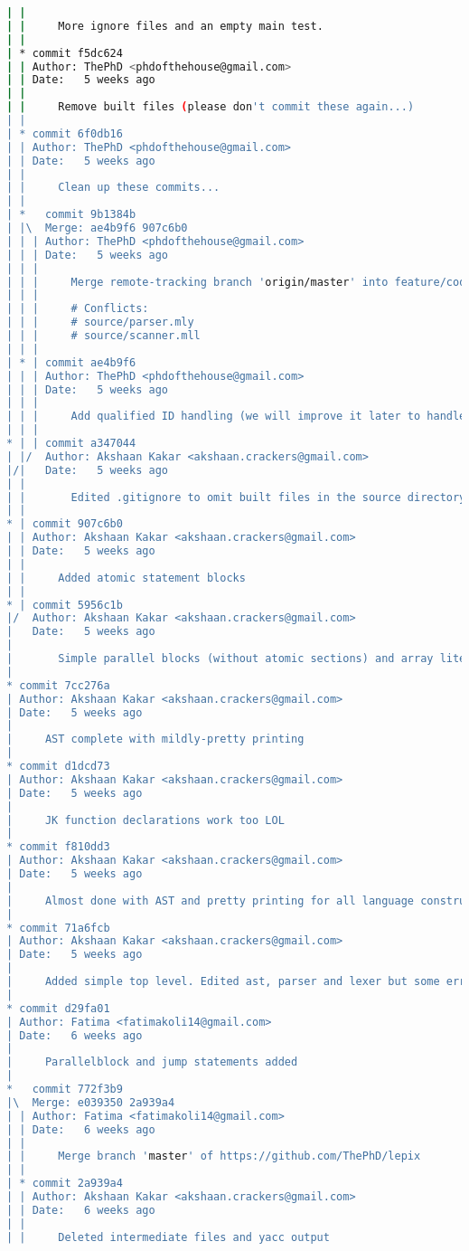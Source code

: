 \begin{lstlisting}[language=bash]
| | 
| |     More ignore files and an empty main test.
| |   
| * commit f5dc624
| | Author: ThePhD <phdofthehouse@gmail.com>
| | Date:   5 weeks ago
| | 
| |     Remove built files (please don't commit these again...)
| |   
| * commit 6f0db16
| | Author: ThePhD <phdofthehouse@gmail.com>
| | Date:   5 weeks ago
| | 
| |     Clean up these commits...
| |     
| *   commit 9b1384b
| |\  Merge: ae4b9f6 907c6b0
| | | Author: ThePhD <phdofthehouse@gmail.com>
| | | Date:   5 weeks ago
| | | 
| | |     Merge remote-tracking branch 'origin/master' into feature/codegen
| | |     
| | |     # Conflicts:
| | |     #	source/parser.mly
| | |     #	source/scanner.mll
| | |    
| * | commit ae4b9f6
| | | Author: ThePhD <phdofthehouse@gmail.com>
| | | Date:   5 weeks ago
| | | 
| | |     Add qualified ID handling (we will improve it later to handle arbitrarily long strings)
| | |    
* | | commit a347044
| |/  Author: Akshaan Kakar <akshaan.crackers@gmail.com>
|/|   Date:   5 weeks ago
| |   
| |       Edited .gitignore to omit built files in the source directory
| |   
* | commit 907c6b0
| | Author: Akshaan Kakar <akshaan.crackers@gmail.com>
| | Date:   5 weeks ago
| | 
| |     Added atomic statement blocks
| |   
* | commit 5956c1b
|/  Author: Akshaan Kakar <akshaan.crackers@gmail.com>
|   Date:   5 weeks ago
|   
|       Simple parallel blocks (without atomic sections) and array literals now work in Parser+AST
|  
* commit 7cc276a
| Author: Akshaan Kakar <akshaan.crackers@gmail.com>
| Date:   5 weeks ago
| 
|     AST complete with mildly-pretty printing
|  
* commit d1dcd73
| Author: Akshaan Kakar <akshaan.crackers@gmail.com>
| Date:   5 weeks ago
| 
|     JK function declarations work too LOL
|  
* commit f810dd3
| Author: Akshaan Kakar <akshaan.crackers@gmail.com>
| Date:   5 weeks ago
| 
|     Almost done with AST and pretty printing for all language constructs. Only function and variable decls to go
|  
* commit 71a6fcb
| Author: Akshaan Kakar <akshaan.crackers@gmail.com>
| Date:   5 weeks ago
| 
|     Added simple top level. Edited ast, parser and lexer but some errors remain. Pretty printing needs to be set up.
|  
* commit d29fa01
| Author: Fatima <fatimakoli14@gmail.com>
| Date:   6 weeks ago
| 
|     Parallelblock and jump statements added
|    
*   commit 772f3b9
|\  Merge: e039350 2a939a4
| | Author: Fatima <fatimakoli14@gmail.com>
| | Date:   6 weeks ago
| | 
| |     Merge branch 'master' of https://github.com/ThePhD/lepix
| |   
| * commit 2a939a4
| | Author: Akshaan Kakar <akshaan.crackers@gmail.com>
| | Date:   6 weeks ago
| | 
| |     Deleted intermediate files and yacc output

\end{lstlisting}
